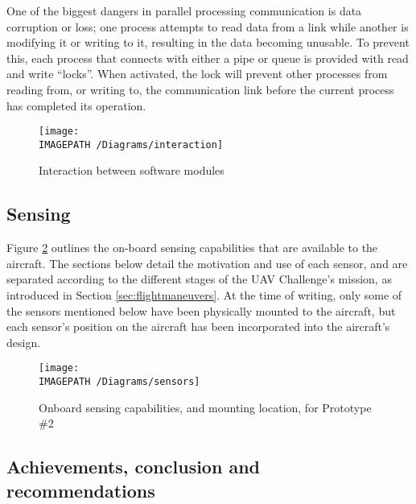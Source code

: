 One of the biggest dangers in parallel processing communication is data corruption or loss; one process attempts to read data from a link while another is modifying it or writing to it, resulting in the data becoming unusable. To prevent this, each process that connects with either a pipe or queue is provided with read and write ``locks''. When activated, the lock will prevent other processes from reading from, or writing to, the communication link before the current process has completed its operation.

\begin{figure}[H]
	\centering
	\texttt{[image: \\IMAGEPATH /Diagrams/interaction]}
	\caption{Interaction between software modules}
	\label{fig:softwareinteraction-exec}
\end{figure}

\subsection{Sensing}

Figure \ref{fig:sensing-exec} outlines the on-board sensing capabilities that are available to the aircraft. The sections below detail the motivation and use of each sensor, and are separated according to the different stages of the UAV Challenge's mission, as introduced in Section \ref{sec:flightmaneuvers}. At the time of writing, only some of the sensors mentioned below have been physically mounted to the aircraft, but each sensor's position on the aircraft has been incorporated into the aircraft's design.

\begin{figure}[!ht]
	\centering
	\texttt{[image: \\IMAGEPATH /Diagrams/sensors]}
	\caption{Onboard sensing capabilities, and mounting location, for Prototype \#2}
	\label{fig:sensing-exec}
\end{figure}


\subsection{Achievements, conclusion and recommendations}